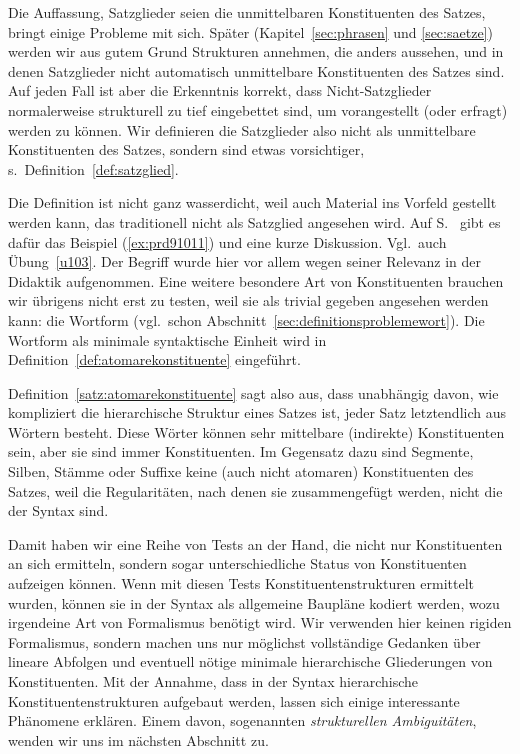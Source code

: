 Die Auffassung, Satzglieder seien die unmittelbaren Konstituenten des Satzes, bringt einige Probleme mit sich.
Später (Kapitel~\ref{sec:phrasen} und \ref{sec:saetze}) werden wir aus gutem Grund Strukturen annehmen, die anders aussehen, und in denen Satzglieder nicht automatisch unmittelbare Konstituenten des Satzes sind.
Auf jeden Fall ist aber die Erkenntnis korrekt, dass Nicht-Satzglieder normalerweise strukturell zu tief eingebettet sind, um \zB vorangestellt (oder erfragt) werden zu können.
Wir definieren die Satzglieder also nicht als unmittelbare Konstituenten des Satzes, sondern sind etwas vorsichtiger, s.\ Definition~\ref{def:satzglied}.


Die Definition ist nicht ganz wasserdicht, weil auch Material ins Vorfeld gestellt werden kann, das traditionell nicht als Satzglied angesehen wird.
Auf S.~\pageref{abs:satzgliedfail} gibt es dafür das Beispiel (\ref{ex:prd91011}) und eine kurze Diskussion.
Vgl.\ auch Übung~\ref{u103}.
Der Begriff wurde hier vor allem wegen seiner Relevanz in der Didaktik aufgenommen.
Eine weitere besondere Art von Konstituenten brauchen wir übrigens nicht erst zu testen, weil sie als trivial gegeben angesehen werden kann: die Wortform (vgl.\ schon Abschnitt~\ref{sec:definitionsproblemewort}).
Die Wortform als minimale syntaktische Einheit wird in Definition~\ref{def:atomarekonstituente} eingeführt.


Definition~\ref{satz:atomarekonstituente} sagt also aus, dass unabhängig davon, wie kompliziert die hierarchische Struktur eines Satzes ist, jeder Satz letztendlich aus Wörtern besteht.
Diese Wörter können sehr mittelbare (indirekte) Konstituenten sein, aber sie sind immer Konstituenten.
Im Gegensatz dazu sind Segmente, Silben, Stämme oder Suffixe keine (auch nicht atomaren) Konstituenten des Satzes, weil die Regularitäten, nach denen sie zusammengefügt werden, nicht die der Syntax sind.

Damit haben wir eine Reihe von Tests an der Hand, die nicht nur Konstituenten an sich ermitteln, sondern sogar unterschiedliche Status von Konstituenten aufzeigen können.
Wenn mit diesen Tests Konstituentenstrukturen ermittelt wurden, können sie in der Syntax als allgemeine Baupläne kodiert werden, wozu irgendeine Art von Formalismus benötigt wird.
Wir verwenden hier keinen rigiden Formalismus, sondern machen uns nur möglichst vollständige Gedanken über lineare Abfolgen und eventuell nötige minimale hierarchische Gliederungen von Konstituenten.
Mit der Annahme, dass in der Syntax hierarchische Konstituentenstrukturen aufgebaut werden, lassen sich einige interessante Phänomene erklären.
Einem davon, sogenannten \textit{strukturellen Ambiguitäten}, wenden wir uns im nächsten Abschnitt zu.

